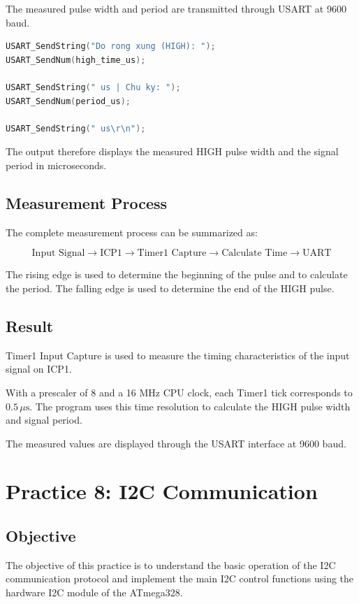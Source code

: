 \documentclass[12pt,a4paper]{article}
\begin{document}
The measured pulse width and period are transmitted through USART at
9600 baud.

\begin{lstlisting}[language=C]
USART_SendString("Do rong xung (HIGH): ");
USART_SendNum(high_time_us);

USART_SendString(" us | Chu ky: ");
USART_SendNum(period_us);

USART_SendString(" us\r\n");
\end{lstlisting}

The output therefore displays the measured HIGH pulse width and the
signal period in microseconds.

\subsection{Measurement Process}

The complete measurement process can be summarized as:

\[
\text{Input Signal}
\rightarrow
\text{ICP1}
\rightarrow
\text{Timer1 Capture}
\rightarrow
\text{Calculate Time}
\rightarrow
\text{UART}
\]

The rising edge is used to determine the beginning of the pulse and
to calculate the period. The falling edge is used to determine the
end of the HIGH pulse.

\subsection{Result}

Timer1 Input Capture is used to measure the timing characteristics of
the input signal on ICP1.

With a prescaler of 8 and a 16 MHz CPU clock, each Timer1 tick
corresponds to $0.5\,\mu\mathrm{s}$. The program uses this time
resolution to calculate the HIGH pulse width and signal period.

The measured values are displayed through the USART interface at
9600 baud.


\section{Practice 8: I2C Communication}

\subsection{Objective}

The objective of this practice is to understand the basic operation of
the I2C communication protocol and implement the main I2C control
functions using the hardware I2C module of the ATmega328.
\end{document}
